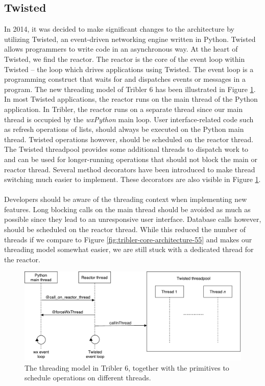 \subsection{Twisted}
In 2014, it was decided to make significant changes to the architecture by utilizing Twisted, an event-driven networking engine written in Python. Twisted allows programmers to write code in an asynchronous way. At the heart of Twisted, we find the reactor. The reactor is the core of the event loop within Twisted – the loop which drives applications using Twisted\cite{twistedreactoroverview}. The event loop is a programming construct that waits for and dispatches events or messages in a program.
The new threading model of Tribler 6 has been illustrated in Figure \ref{fig:old-threading-model}. In most Twisted applications, the reactor runs on the main thread of the Python application. In Tribler, the reactor runs on a separate thread since our main thread is occupied by the \emph{wxPython} main loop. User interface-related code such as refresh operations of lists, should always be executed on the Python main thread. Twisted operations however, should be scheduled on the reactor thread. The Twisted threadpool provides some additional threads to dispatch work to and can be used for longer-running operations that should not block the main or reactor thread. Several method decorators have been introduced to make thread switching much easier to implement. These decorators are also visible in Figure \ref{fig:old-threading-model}.\\\\
Developers should be aware of the threading context when implementing new features. Long blocking calls on the main thread should be avoided as much as possible since they lead to an unresponsive user interface. Database calls however, should be scheduled on the reactor thread. While this reduced the number of threads if we compare to Figure \ref{fig:tribler-core-architecture-55} and makes our threading model somewhat easier, we are still stuck with a dedicated thread for the reactor.

\begin{figure}[h!]
	\centering
	\includegraphics[width=0.9\columnwidth]{images/architecture/threading_model_tribler}
	\caption{The threading model in Tribler 6, together with the primitives to schedule operations on different threads.}
	\label{fig:old-threading-model}
\end{figure}

